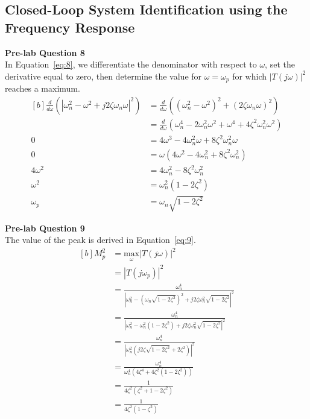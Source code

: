 \documentclass[12pt]{article}
\begin{document}
\subsection{Closed-Loop System Identification using the Frequency Response}
\textbf{Pre-lab Question 8} \\
In Equation~\ref{eq:8}, we differentiate the denominator with respect to $\omega$, set the derivative equal to zero, then determine the value for $\omega = \omega_p$ for which $\left| T(j\omega) \right|^2$ reaches a maximum.
\begin{equation} \label{eq:8}
\begin{aligned}[b]
    \frac{d}{d\omega} \left( \left|\omega_n^2 - \omega^2 + j2\zeta\omega_n\omega \right|^2 \right) &= \frac{d}{d\omega} \left( (\omega_n^2 - \omega^2)^2 + (2 \zeta \omega_n \omega)^2 \right) \\
    &= \frac{d}{d\omega} \left( \omega_n^4 - 2\omega_n^2\omega^2 + \omega^4 + 4\zeta^2\omega_n^2\omega^2 \right) \\
    0 &= 4\omega^3 - 4\omega_n^2\omega + 8\zeta^2\omega_n^2\omega \\
    0 &= \omega \left( 4\omega^2 - 4\omega_n^2 + 8\zeta^2\omega_n^2 \right) \\
    4\omega^2 &= 4\omega_n^2 - 8\zeta^2\omega_n^2 \\
    \omega^2 &= \omega_n^2 \left( 1 - 2\zeta^2 \right) \\
    \omega_p &= \omega_n \sqrt{1 - 2\zeta^2}
\end{aligned}
\end{equation}

\textbf{Pre-lab Question 9} \\
The value of the peak is derived in Equation~\ref{eq:9}.
\begin{equation} \label{eq:9}
\begin{aligned}[b]
    M_p^2 &= \underset{\omega}{\text{max}}\left| T(j\omega) \right|^2 \\
    &= \left| T(j\omega_p) \right|^2 \\
    &= \frac{\omega_n^4}{\left| \omega_n^2 - (\omega_n\sqrt{1-2\zeta^2})^2 + j2\zeta\omega_n^2\sqrt{1-2\zeta^2} \right|^2} \\
    &= \frac{\omega_n^4}{\left| \omega_n^2 - \omega_n^2(1-2\zeta^2) + j2\zeta\omega_n^2\sqrt{1-2\zeta^2} \right|^2} \\
    &= \frac{\omega_n^4}{\left| \omega_n^2 \left( j2\zeta\sqrt{1-2\zeta^2} + 2\zeta^2 \right) \right|^2} \\
    &= \frac{\omega_n^4}{\omega_n^4 (4\zeta^4 + 4\zeta^2 (1-2\zeta^2))} \\
    &= \frac{1}{4\zeta^2 (\zeta^2 + 1 - 2\zeta^2)} \\
    &= \frac{1}{4\zeta^2 (1 - \zeta^2)}
\end{aligned}
\end{equation}
\end{document}
